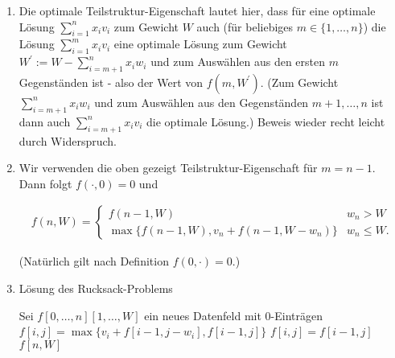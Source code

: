 \begin{solution}

\phantom{}

\begin{enumerate}[label = \alph*)]
  \item Die optimale Teilstruktur-Eigenschaft lautet hier, dass für eine optimale Lösung $\sum_{i=1}^n x_iv_i$ zum Gewicht $W$ auch (für beliebiges $m \in \{1,\dots,n\}$) die Lösung $\sum_{i=1}^m x_iv_i$  eine optimale Lösung zum Gewicht $W^{\prime} := W - \sum_{i=m+1}^n x_iw_i$ und zum Auswählen aus den ersten $m$ Gegenständen ist - also der Wert von $f(m, W^{\prime})$. (Zum Gewicht $\sum_{i=m+1}^n x_iw_i$ und zum Auswählen aus den Gegenständen $m+1, \dots, n$ ist dann auch $\sum_{i=m+1}^n x_iv_i$ die optimale Lösung.) Beweis wieder recht leicht durch Widerspruch.
  \item Wir verwenden die oben gezeigt Teilstruktur-Eigenschaft für $m = n-1$.
  Dann folgt $f(\cdot,0) = 0$ und

  \begin{align*}
    f(n,W) = \begin{cases}
      f(n-1,W) & w_n > W \\
      \max\{f(n-1,W), v_n + f(n-1, W-w_n)\} & w_n \leq W.
    \end{cases}
  \end{align*}

  (Natürlich gilt nach Definition $f(0,\cdot) = 0$.)

  \item
  \begin{algorithm}
      \caption{Lösung des Rucksack-Problems}
      \begin{algorithmic}[1]
              Sei $f[0,\dots,n][1,\dots,W]$ ein neues Datenfeld mit $0$-Einträgen
                          \State $f[i,j] = \max\{v_i + f[i-1,j-w_i], f[i-1,j]\}$
                      \Else
                          \State $f[i,j] = f[i-1,j]$
                      \EndIf
                  \EndFor
              \EndFor
              \State \Return $f[n,W]$
          \EndProcedure
      \end{algorithmic}
  \end{algorithm}
\end{enumerate}

\end{solution}
